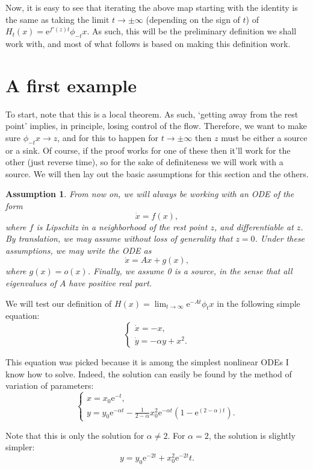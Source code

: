 \documentclass{article}
\newcommand{\e}{\mathrm{e}}
\newtheorem*{Assumption}{Assumption}
\begin{document}
Now, it is easy to see that iterating the above map starting with the identity is the same as taking the limit $t \to \pm\infty$ (depending on the sign of $t$) of $H_t(x) = \e^{f'(z) t} \phi_{-t} x$. As such, this will be the preliminary definition we shall work with, and most of what follows is based on making this definition work.

\section{A first example}

To start, note that this is a local theorem. As such, `getting away from the rest point' implies, in principle, losing control of the flow. Therefore, we want to make sure $\phi_{-t} x \to z$, and for this to happen for $t \to \pm \infty$ then $z$ must be either a source or a sink. Of course, if the proof works for one of these then it'll work for the other (just reverse time), so for the sake of definiteness we will work with a source. We will then lay out the basic assumptions for this section and the others.

\begin{Assumption}
From now on, we will always be working with an ODE of the form
\[\dot x = f(x),\]
where $f$ is Lipschitz in a neighborhood of the rest point $z$, and differentiable at $z$. By translation, we may assume without loss of generality that $z = 0$. Under these assumptions, we may write the ODE as
\[\dot x = A x + g(x),\]
where $g(x) = o(x)$. Finally, we assume 0 is a source, in the sense that all eigenvalues of $A$ have positive real part.
\end{Assumption}

We will test our definition of $H(x) = \lim_{t \to \infty} \e^{-A t} \phi_t x$ in the following simple equation:
\[
\begin{cases}
\dot x = -x,\\
\dot y = -\alpha y + x^2.
\end{cases}
\]

This equation was picked because it is among the simplest nonlinear ODEs I know how to solve. Indeed, the solution can easily be found by the method of variation of parameters:
\[
\begin{cases}
x = x_0 \e^{-t},\\
y = y_0 \e^{-\alpha t} - \frac1{2-\alpha} x_0^2 \e^{-\alpha t} (1 - \e^{(2 - \alpha)t}).
\end{cases}
\]

Note that this is only the solution for $\alpha \neq 2$. For $\alpha = 2$, the solution is slightly simpler:
\[y = y_0 \e^{-2 t} + x_0^2 \e^{- 2 t} t.\]
\end{document}

